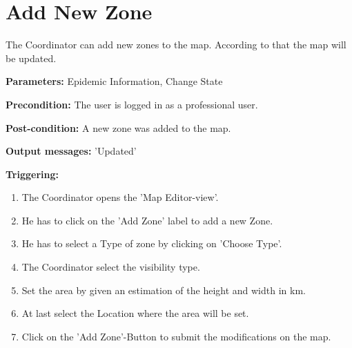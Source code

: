 \section{Add New Zone}
\label{operation:AddNewZoneS}
The Coordinator can add new zones to the map. According to that the map will
be updated.\\
\begin{description}
\item \textbf{Parameters:} Epidemic Information, Change State
\item \textbf{Precondition:} The user is logged in as a professional user.
\item \textbf{Post-condition:} A new zone was added to the map.
\item \textbf{Output messages:} 'Updated'
\item \textbf{Triggering:}
\begin{enumerate}
\item The Coordinator opens the 'Map Editor-view'.
\item He has to click on the 'Add Zone' label to add a new Zone.
\item He has to select a Type of zone by clicking on 'Choose Type'.
\item The Coordinator select the visibility type.
\item Set the area by given an estimation of the height and width in km.
\item At last select the Location where the area will be set.
\item Click on the 'Add Zone'-Button to submit the modifications
on the map.
\end{enumerate}
\end{description} 

